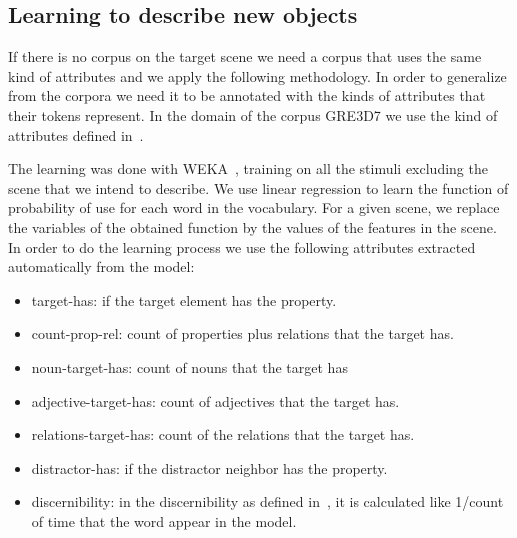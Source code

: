 \subsection{Learning to describe new objects}

If there is no corpus on the target scene we need a corpus that uses the same kind of attributes and we apply the following methodology. In order to generalize from the corpora we need it to be annotated with the kinds of attributes that their tokens represent. In the domain of the corpus GRE3D7 we use the kind of attributes defined in~\cite{viet:gene11}. 

The learning was done with WEKA~\cite{Hall:WEK09}, training on all the stimuli excluding the scene that we intend to describe. We use linear regression to learn the function of probability of use for each word in the vocabulary. For a given scene, we replace the variables of the obtained function by the values of the features in the scene. In order to do the learning process we use the following attributes extracted automatically from the model:  

\begin{itemize}
\item target-has: if the target element has the property.
\item count-prop-rel: count of properties plus relations that the target has.
\item noun-target-has: count of nouns that the target has
\item adjective-target-has: count of adjectives that the target has.
\item relations-target-has: count of the relations that the target has.
\item distractor-has: if the distractor neighbor has the property.
\item discernibility: in the discernibility as defined in~\cite{gatt:nond11}, it is calculated like 1/count of time that the word appear in the model.
\end{itemize}



